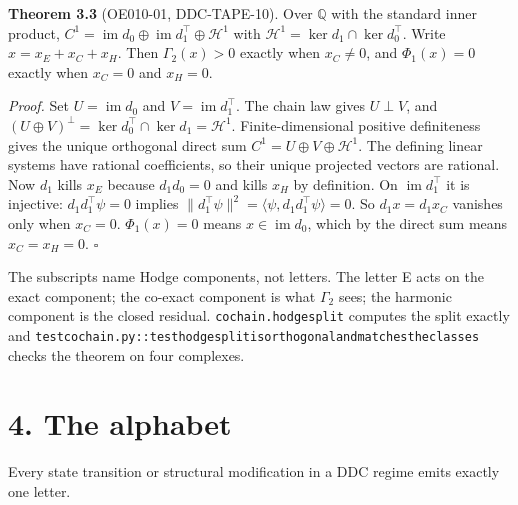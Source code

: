 \documentclass[
  11pt,
]{article}
\renewcommand{\_}{\ddcunderscore\allowbreak}
\begin{document}
\textbf{Theorem 3.3} (OE010-01, DDC-TAPE-10). Over \(\mathbb{Q}\) with
the standard inner product,
\(C^1 = \operatorname{im} d_0 \oplus \operatorname{im} d_1^{\top}
\oplus \mathcal{H}^1\) with
\(\mathcal{H}^1 = \ker d_1 \cap \ker d_0^{\top}\). Write
\(x = x_E + x_C + x_H\). Then \(\Gamma_2(x) > 0\) exactly when
\(x_C \neq 0\), and \(\Phi_1(x) = 0\) exactly when \(x_C = 0\) and
\(x_H = 0\).

\emph{Proof.} Set \(U=\operatorname{im}d_0\) and
\(V=\operatorname{im}d_1^{\top}\). The chain law gives \(U\perp V\), and
\((U\oplus V)^\perp=\ker d_0^{\top}\cap\ker d_1=\mathcal H^1\).
Finite-dimensional positive definiteness gives the unique orthogonal
direct sum \(C^1=U\oplus V\oplus\mathcal H^1\). The defining linear
systems have rational coefficients, so their unique projected vectors
are rational. Now \(d_1\) kills \(x_E\) because \(d_1 d_0 = 0\) and
kills \(x_H\) by definition. On \(\operatorname{im} d_1^{\top}\) it is
injective: \(d_1 d_1^{\top}\psi = 0\) implies
\(\lVert d_1^{\top}\psi \rVert^2 = \langle \psi, d_1 d_1^{\top}\psi
\rangle = 0\). So \(d_1 x = d_1 x_C\) vanishes only when \(x_C = 0\).
\(\Phi_1(x) = 0\) means \(x \in \operatorname{im} d_0\), which by the
direct sum means \(x_C = x_H = 0\). \(\square\)

The subscripts name Hodge components, not letters. The letter E acts on
the exact component; the co-exact component is what \(\Gamma_2\) sees;
the harmonic component is the closed residual.
\texttt{cochain.\allowbreak hodge\_split} computes the split exactly and
\texttt{test\_cochain.\allowbreak py::test\_hodge\_split\_is\_orthogonal\_and\_matches\_the\_classes}
checks the theorem on four complexes.

\section{4. The alphabet}\label{the-alphabet}

Every state transition or structural modification in a DDC regime emits
exactly one letter.
\end{document}
